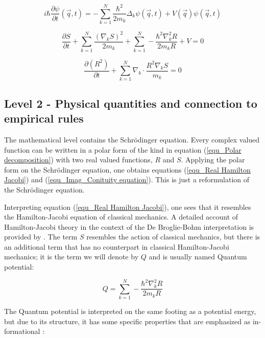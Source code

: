 \documentclass{article}
\begin{document}
\begin{equation}
i\hbar \frac{\partial \psi}{\partial t}(\vec q,t)=-\sum_{k=1}^{N} \frac{\hbar^2}{2m_k}\Delta_k \psi(\vec q,t)+V(\vec q)\psi(\vec q,t) 
\label{eqn_Schrödinger1}
\end{equation}

\begin{equation}
\frac{\partial S}{\partial t} + \sum_{k=1}^{N}  \frac{(\nabla_k S)^2}{2m_k}+\sum_{k=1}^{N} - \frac{\hbar^2\nabla^2_k R}{2m_kR}+V=0
\label{equ_Real Hamilton Jacobi}
\end{equation}

\begin{equation}
\frac{\partial (R^2)}{\partial t} + \sum_{k=1}^{N} \nabla_k \cdot \frac{R^2\nabla_k S}{m_k} =0
\label{equ_Imag_Conituity equation}
\end{equation}

\subsection*{Level 2 - Physical quantities and connection to empirical rules}

The mathematical level contains the Schr\"odinger equation. Every complex valued function can be written in a polar form of the kind in equation (\ref{equ_Polar decomposition}) with two real valued functions, $R$ and $S$. Applying the polar form on the Schr\"odinger equation, one obtains equations (\ref{equ_Real Hamilton Jacobi}) and (\ref{equ_Imag_Conituity equation}). This is just a reformulation of the Schr\"odinger equation. \newline

Interpreting equation (\ref{equ_Real Hamilton Jacobi}), one sees that it resembles the Hamilton-Jacobi equation of classical mechanics. A detailed account of Hamilton-Jacobi theory in the context of the De Broglie-Bohm interpretation is provided by \cite[p.27]{holland1995quantum}. The term $S$ resembles the action of classical mechanics, but there is an additional term that has no counterpart in classical Hamilton-Jacobi mechanics; it is the term we will denote by $Q$ and is usually named Quantum potential:

\begin{equation}
Q = \sum_{k=1}^{N} - \frac{\hbar^2\nabla^2_k R}{2m_kR}
\label{equ_Quantum potential}
\end{equation}

The Quantum potential is interpreted on the same footing as a potential energy, but due to its structure, it has some specific properties that are emphasized as in-formational \cite[p.89]{holland1995quantum}:
\end{document}
